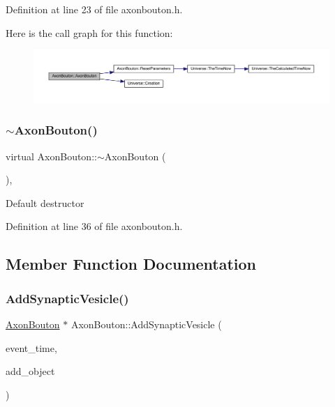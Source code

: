 Definition at line 23 of file axonbouton.\+h.

Here is the call graph for this function\+:
\nopagebreak
\begin{figure}[H]
\begin{center}
\leavevmode
\includegraphics[width=350pt]{class_axon_bouton_a6d671fc3b6bd8e617085c1bc7212400d_cgraph}
\end{center}
\end{figure}
\mbox{\label{class_axon_bouton_ab6f93f680d19d4f07476d1d1b3de776a}} 
\subsubsection{\texorpdfstring{$\sim$\+Axon\+Bouton()}{~AxonBouton()}}
{\footnotesize\ttfamily virtual Axon\+Bouton\+::$\sim$\+Axon\+Bouton (\begin{DoxyParamCaption}{ }\end{DoxyParamCaption})\hspace{0.3cm}{\ttfamily [inline]}, {\ttfamily [virtual]}}

Default destructor 

Definition at line 36 of file axonbouton.\+h.



\subsection{Member Function Documentation}
\mbox{\label{class_axon_bouton_a3009e5d49c699afa7f633b026b37ed77}} 
\subsubsection{\texorpdfstring{Add\+Synaptic\+Vesicle()}{AddSynapticVesicle()}}
{\footnotesize\ttfamily \hyperlink{class_axon_bouton}{Axon\+Bouton} $\ast$ Axon\+Bouton\+::\+Add\+Synaptic\+Vesicle (\begin{DoxyParamCaption}\item[{std\+::chrono\+::time\+\_\+point$<$ \hyperlink{universe_8h_a0ef8d951d1ca5ab3cfaf7ab4c7a6fd80}{Clock} $>$}]{event\+\_\+time,  }\item[{\hyperlink{class_axon_bouton}{Axon\+Bouton} $\ast$}]{add\+\_\+object }\end{DoxyParamCaption})}



